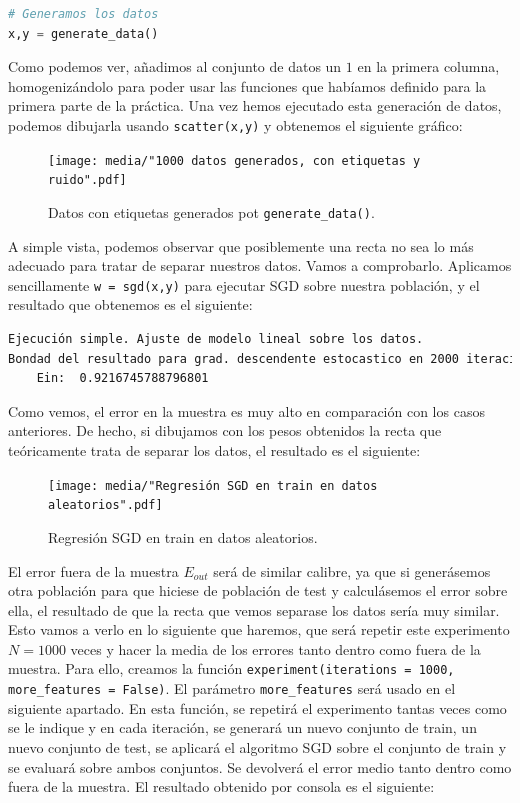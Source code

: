 \documentclass[12pt]{scrartcl}
\begin{document}
{\begin{lstlisting}[language=Python]
# Generamos los datos
x,y = generate_data()
\end{lstlisting}

Como podemos ver, añadimos al conjunto de datos un $1$ en la primera columna, homogenizándolo para poder usar las funciones que habíamos definido para la primera parte de la práctica. Una vez hemos
ejecutado esta generación de datos, podemos dibujarla usando \lstinline{scatter(x,y)} y obtenemos el siguiente gráfico:
\begin{figure}[H]
  \centering
  \texttt{[image: media/"1000 datos generados, con etiquetas y ruido".pdf]}
  \caption{Datos con etiquetas generados pot \lstinline{generate_data()}.}
\end{figure}

A simple vista, podemos observar que posiblemente una recta no sea lo más adecuado para tratar de separar nuestros datos. Vamos a comprobarlo.
Aplicamos sencillamente \lstinline{w = sgd(x,y)} para ejecutar SGD sobre nuestra población, y el resultado que obtenemos es el siguiente:

\begin{lstlisting}[language=bash]
Ejecución simple. Ajuste de modelo lineal sobre los datos.
Bondad del resultado para grad. descendente estocastico en 2000 iteraciones:
    Ein:  0.9216745788796801
\end{lstlisting}

Como vemos, el error en la muestra es muy alto en comparación con los casos anteriores. De hecho, si dibujamos con los pesos obtenidos la recta que teóricamente trata de separar los datos, el resultado es el siguiente:
\begin{figure}[H]
  \centering
  \texttt{[image: media/"Regresión SGD en train en datos aleatorios".pdf]}
  \caption{Regresión SGD en train en datos aleatorios.}
\end{figure}

El error fuera de la muestra $E_{out}$ será de similar calibre, ya que si generásemos otra población para que hiciese de población de test y calculásemos el error sobre ella, el resultado de que la recta que vemos separase los datos
sería muy similar. Esto vamos a verlo en lo siguiente que haremos, que será repetir este experimento $N =1000$ veces y hacer la media de los errores tanto dentro como fuera de la muestra. Para ello, creamos la función \lstinline{experiment(iterations = 1000, more_features = False)}. 
El parámetro \lstinline{more_features} será usado en el siguiente apartado. En esta función, se repetirá el experimento tantas veces como se le indique y en cada iteración, se generará un nuevo conjunto de train, un nuevo conjunto de test, se aplicará
el algoritmo SGD sobre el conjunto de train y se evaluará sobre ambos conjuntos. Se devolverá el error medio tanto dentro como fuera de la muestra. El resultado obtenido por consola es el siguiente:

}
\end{document}
